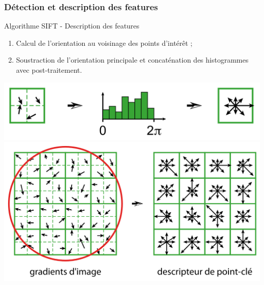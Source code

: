 \documentclass[8pt]{beamer}
\begin{document}
\begin{frame}
\begin{minipage}[c]{.3\textwidth}
		\end{minipage}\hfill
		\begin{minipage}[c]{.3\textwidth}
		\end{minipage}\hfill
	\end{frame}
	\begin{frame}
		\frametitle{Détection et description des features}
		\begin{block}{Algorithme SIFT - Description des features}
			\begin{enumerate}
				\item Calcul de l'orientation au voisinage des points d'intérêt ;
				\item Soustraction de l'orientation principale et concaténation des histogrammes avec post-traitement.
			\end{enumerate}
		\end{block}
		\centering
		\includegraphics[width=.45\textwidth]{SIFT-descr02.png}\\	\includegraphics[height=.3\textwidth]{SIFT-descr01.png}
	\end{frame}
\end{document}
